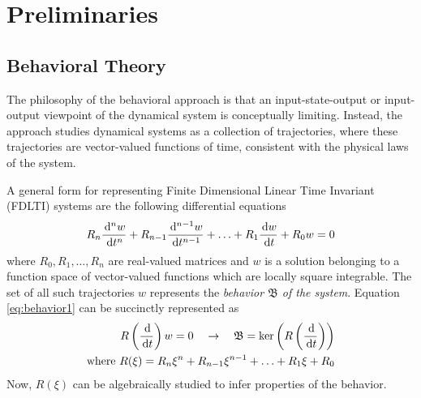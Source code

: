 \chapter{Preliminaries}
\label{chap:behavioraltheory} %
\section{Behavioral Theory}\doublespacing %
\label{sec:ba}
The philosophy of the behavioral approach is that an input-state-output or input-output viewpoint of the dynamical system is conceptually limiting. Instead, the approach studies dynamical systems as a collection of trajectories, where these trajectories are vector-valued functions of time, consistent with the physical laws of the system. 

A general form for representing Finite Dimensional Linear Time Invariant (FDLTI) systems are the following differential equations
\begin{equation}\label{eq:behavior1}
R_n \frac{\d ^n w}{\d t^n} + R_{n-1}\frac{\d ^{n-1} w}{\d t^{n-1}} + \ldots + R_1 \frac{\d w}{\d t} + R_0w = 0
\end{equation}
where $R_0, R_1, \ldots , R_n$ are real-valued matrices and $w$ is a solution belonging to a function space of vector-valued functions which are locally square integrable. The set of all such trajectories $w$ represents the \emph{behavior $\mathfrak{B}$ of the system}. Equation \ref{eq:behavior1} can be succinctly represented as
\begin{align}\label{eq:behavior2}
R\left(\frac{\d}{\d t}\right)w = 0 \quad \rightarrow \quad\mathfrak{B}=\operatorname{ker}\left(R\left(\frac{\d}{\d t}\right)\right)\\
\text{where } R(\xi) = R_n \xi^n + R_{n-1} \xi^{n-1} + \ldots + R_1 \xi + R_0 
\end{align}
Now, $R(\xi)$ can be algebraically studied to infer properties of the behavior.
